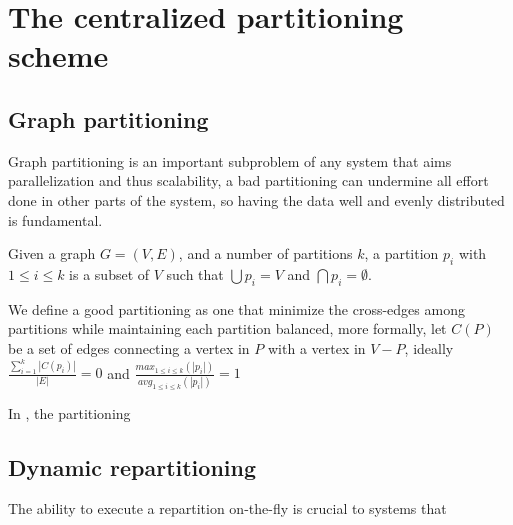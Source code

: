 \section{The centralized partitioning scheme}



\subsection{Graph partitioning}
Graph partitioning is an important subproblem of any system that aims parallelization and thus scalability, a bad partitioning can undermine all effort done in other parts of the system, so having the data well and evenly distributed is fundamental.


Given a graph $G = (V, E)$, and a number of partitions $k$, a partition $p_i$ with $1 \leq i \leq k$ is a subset of $V$ such that $\bigcup p_i = V$ and $\bigcap p_i = \emptyset$.

We define a good partitioning as one that minimize the cross-edges among partitions while maintaining each partition balanced, more formally, let $C(P)$ be a set of edges connecting a vertex in $P$ with a vertex in $V - P$, ideally $\frac{\sum_{i=1}^{k}|C(p_i)|}{|E|} = 0$ and $\frac{max_{1 \leq i \leq k}(|p_i|)}{avg_{1 \leq i \leq k}(|p_i|)} = 1$





In \appname, the partitioning 

\subsection{Dynamic repartitioning}
The ability to execute a repartition on-the-fly is crucial to systems that 

